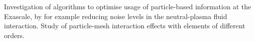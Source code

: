 Investigation of algorithms to optimise usage of particle-based information at the Exascale, by for example
reducing noise levels in the neutral-plasma fluid interaction. Study of particle-mesh interaction
effects with elements of different orders.

